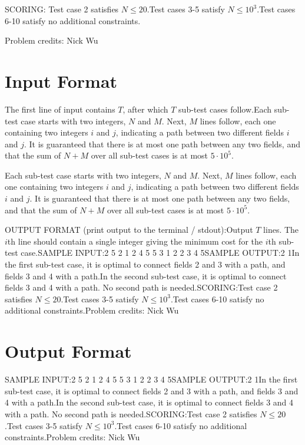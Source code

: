 \documentclass[12pt]{article}
\begin{document}
SCORING:
Test case 2 satisfies $N \le 20$.Test cases 3-5 satisfy $N \le 10^3$.Test cases 6-10 satisfy no additional constraints.


Problem credits: Nick Wu



\section*{Input Format}
The first line of input contains $T$, after which $T$ sub-test cases follow.Each sub-test case starts with two integers, $N$ and $M$.  Next, $M$ lines
follow,  each one containing two integers $i$ and $j$, indicating a path between
two different fields $i$ and $j$. It is guaranteed that there is at most one
path between any two fields, and that the sum of $N+M$ over all sub-test cases
is at most $5 \cdot 10^5$.

Each sub-test case starts with two integers, $N$ and $M$.  Next, $M$ lines
follow,  each one containing two integers $i$ and $j$, indicating a path between
two different fields $i$ and $j$. It is guaranteed that there is at most one
path between any two fields, and that the sum of $N+M$ over all sub-test cases
is at most $5 \cdot 10^5$.

OUTPUT FORMAT (print output to the terminal / stdout):Output $T$ lines. The $i$th line should contain a single integer giving the
minimum cost for the $i$th sub-test case.SAMPLE INPUT:2
5 2
1 2
4 5
5 3
1 2
2 3
4 5SAMPLE OUTPUT:2
1In the first sub-test case, it is optimal to connect fields 2 and 3 with a 
path, and fields 3 and 4 with a path.In the second sub-test case, it is optimal to connect fields 3 and 4 with a
path.  No second path is needed.SCORING:Test case 2 satisfies $N \le 20$.Test cases 3-5 satisfy $N \le 10^3$.Test cases 6-10 satisfy no additional constraints.Problem credits: Nick Wu

\section*{Output Format}
SAMPLE INPUT:2
5 2
1 2
4 5
5 3
1 2
2 3
4 5SAMPLE OUTPUT:2
1In the first sub-test case, it is optimal to connect fields 2 and 3 with a 
path, and fields 3 and 4 with a path.In the second sub-test case, it is optimal to connect fields 3 and 4 with a
path.  No second path is needed.SCORING:Test case 2 satisfies $N \le 20$.Test cases 3-5 satisfy $N \le 10^3$.Test cases 6-10 satisfy no additional constraints.Problem credits: Nick Wu
\end{document}
